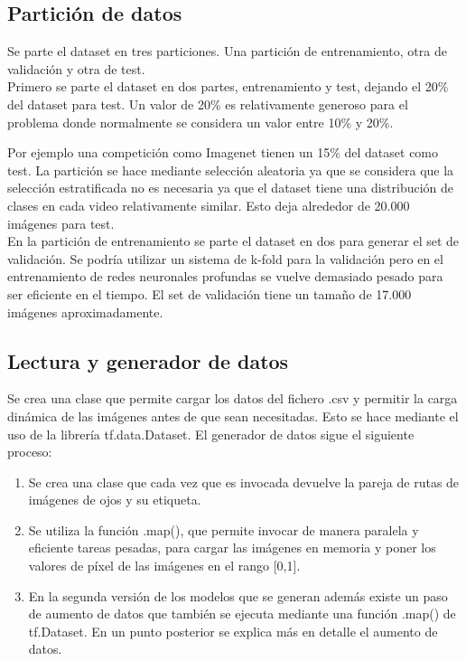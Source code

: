 \documentclass[12pt]{article}
\begin{document}
    \subsection*{Partición de datos}

    Se parte el dataset en tres particiones.
    Una partición de entrenamiento, otra de validación y otra de test.\\
    Primero se parte el dataset en dos partes, entrenamiento y test, dejando el 20\% del dataset para test.
    Un valor de 20\% es relativamente generoso para el problema donde normalmente se considera un valor entre 10\% y
    20\%.

    Por ejemplo una competición como Imagenet tienen un 15\% del dataset como test\cite{imageNet}.
    La partición se hace mediante selección aleatoria ya que se considera que la selección estratificada no es
    necesaria ya que el dataset tiene una distribución de clases en cada video relativamente similar.
    Esto deja alrededor de 20.000 imágenes para test.\\
    En la partición de entrenamiento se parte el dataset en dos para generar el set de validación.
    Se podría utilizar un sistema de k-fold para la validación pero en el entrenamiento de redes neuronales
    profundas se vuelve demasiado pesado para ser eficiente en el tiempo.
    El set de validación tiene un tamaño de 17.000 imágenes aproximadamente.

    \subsection*{Lectura y generador de datos}
    Se crea una clase que permite cargar los datos del fichero .csv y permitir la carga dinámica de las
    imágenes antes de que sean necesitadas.
    Esto se hace mediante el uso de la librería tf.data.Dataset\cite{tfdata_dataset}.
    El generador de datos sigue el siguiente proceso:
    \begin{enumerate}
        \item Se crea una clase que cada vez que es invocada devuelve la pareja de rutas de imágenes de ojos y su
        etiqueta.
        \item Se utiliza la función .map(), que permite invocar de manera paralela y eficiente tareas pesadas, para
        cargar las imágenes en memoria y poner los valores de píxel de las imágenes en el rango [0,1].
        \item En la segunda versión de los modelos que se generan además existe un paso de aumento de datos que
        también se ejecuta mediante una función .map() de tf.Dataset.
        En un punto posterior se explica más en detalle el aumento de datos.
    \end{enumerate}
\end{document}
